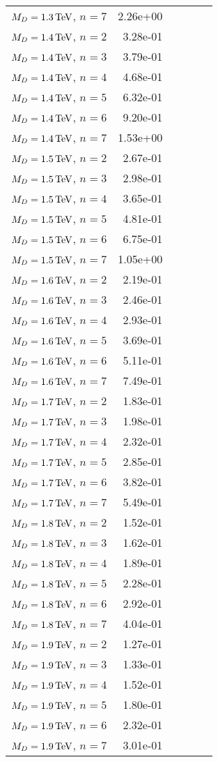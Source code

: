 \begin{table}[hbtp]
\begin{center}
{\begin{tabular}{rrrrrr}
$M_{D} = 1.3 \TeV$, $n=7$  & 2.26e+00 \\
$M_{D} = 1.4 \TeV$, $n=2$  & 3.28e-01 \\
$M_{D} = 1.4 \TeV$, $n=3$  & 3.79e-01 \\
$M_{D} = 1.4 \TeV$, $n=4$  & 4.68e-01 \\
$M_{D} = 1.4 \TeV$, $n=5$  & 6.32e-01 \\
$M_{D} = 1.4 \TeV$, $n=6$  & 9.20e-01 \\
$M_{D} = 1.4 \TeV$, $n=7$  & 1.53e+00 \\
$M_{D} = 1.5 \TeV$, $n=2$  & 2.67e-01 \\
$M_{D} = 1.5 \TeV$, $n=3$  & 2.98e-01 \\
$M_{D} = 1.5 \TeV$, $n=4$  & 3.65e-01 \\
$M_{D} = 1.5 \TeV$, $n=5$  & 4.81e-01 \\
$M_{D} = 1.5 \TeV$, $n=6$  & 6.75e-01 \\
$M_{D} = 1.5 \TeV$, $n=7$  & 1.05e+00 \\
$M_{D} = 1.6 \TeV$, $n=2$  & 2.19e-01 \\
$M_{D} = 1.6 \TeV$, $n=3$  & 2.46e-01 \\
$M_{D} = 1.6 \TeV$, $n=4$  & 2.93e-01 \\
$M_{D} = 1.6 \TeV$, $n=5$  & 3.69e-01 \\
$M_{D} = 1.6 \TeV$, $n=6$  & 5.11e-01 \\
$M_{D} = 1.6 \TeV$, $n=7$  & 7.49e-01 \\
$M_{D} = 1.7 \TeV$, $n=2$  & 1.83e-01 \\
$M_{D} = 1.7 \TeV$, $n=3$  & 1.98e-01 \\
$M_{D} = 1.7 \TeV$, $n=4$  & 2.32e-01 \\
$M_{D} = 1.7 \TeV$, $n=5$  & 2.85e-01 \\
$M_{D} = 1.7 \TeV$, $n=6$  & 3.82e-01 \\
$M_{D} = 1.7 \TeV$, $n=7$  & 5.49e-01 \\
$M_{D} = 1.8 \TeV$, $n=2$  & 1.52e-01 \\
$M_{D} = 1.8 \TeV$, $n=3$  & 1.62e-01 \\
$M_{D} = 1.8 \TeV$, $n=4$  & 1.89e-01 \\
$M_{D} = 1.8 \TeV$, $n=5$  & 2.28e-01 \\
$M_{D} = 1.8 \TeV$, $n=6$  & 2.92e-01 \\
$M_{D} = 1.8 \TeV$, $n=7$  & 4.04e-01 \\
$M_{D} = 1.9 \TeV$, $n=2$  & 1.27e-01 \\
$M_{D} = 1.9 \TeV$, $n=3$  & 1.33e-01 \\
$M_{D} = 1.9 \TeV$, $n=4$  & 1.52e-01 \\
$M_{D} = 1.9 \TeV$, $n=5$  & 1.80e-01 \\
$M_{D} = 1.9 \TeV$, $n=6$  & 2.32e-01 \\
$M_{D} = 1.9 \TeV$, $n=7$  & 3.01e-01 \\\hline
  \end{tabular}
}
  \end{center}
\end{table}



